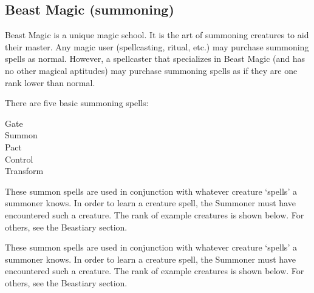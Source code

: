 \documentclass[twoside]{book}
\begin{document}
    

\subsection{Beast Magic (summoning)}
    
    {  
      Beast Magic is a unique magic school. It is the art
               of summoning creatures to aid their master. Any magic user
               (spellcasting, ritual, etc.) may purchase summoning spells
               as normal. However, a spellcaster that specializes in
               Beast Magic (and has no other magical aptitudes) may
               purchase summoning spells as if they are one rank lower
               than normal. 
    }
  
    {  
      There are five basic summoning spells: 
    }
  
\begin{description}
    
  \item[ Gate ] 
  \item[ Summon ] 
  \item[ Pact ] 
  \item[ Control ] 
  \item[ Transform ] 
\end{description}
  
    {  
      These summon spells are used in conjunction with
               whatever creature `spells' a summoner knows.
               In order to learn a creature spell, the Summoner must have
               encountered such a creature. The rank of example creatures
               is shown below. For others, see the Beastiary section.
               
    }
  
    {  
      These summon spells are used in conjunction with
               whatever creature `spells' a summoner knows.
               In order to learn a creature spell, the Summoner must have
               encountered such a creature. The rank of example creatures
               is shown below. For others, see the Beastiary section.
               
    }
  
\end{document}
